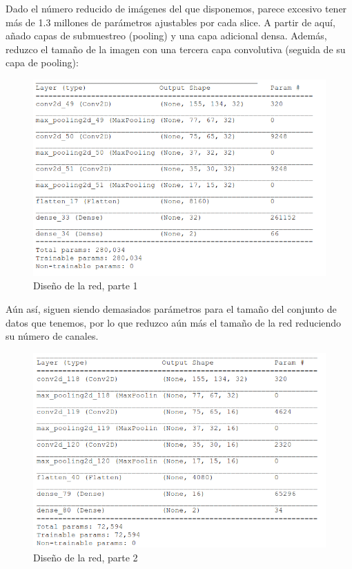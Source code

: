 Dado el número reducido de imágenes del que disponemos, parece excesivo tener más de 1.3 millones de parámetros ajustables por cada slice. A partir de aquí, añado capas de submuestreo (pooling) y una capa adicional densa. Además, reduzco el tamaño de la imagen con una tercera capa convolutiva (seguida de su capa de pooling):

\begin{figure}[H] %
	\centering
	\includegraphics[scale=0.6]{confnn2.png}  %
	\caption{Diseño de la red, parte 1} 
	\label{fig:confnn2}
\end{figure}



Aún así, siguen siendo demasiados parámetros para el tamaño del conjunto de datos que tenemos, por lo que reduzco aún más el tamaño de la red reduciendo su número de canales.

\begin{figure}[H] %
	\centering
	\includegraphics[scale=0.6]{confnn3.png}  %
	\caption{Diseño de la red, parte 2} 
	\label{fig:confnn3}
\end{figure}


